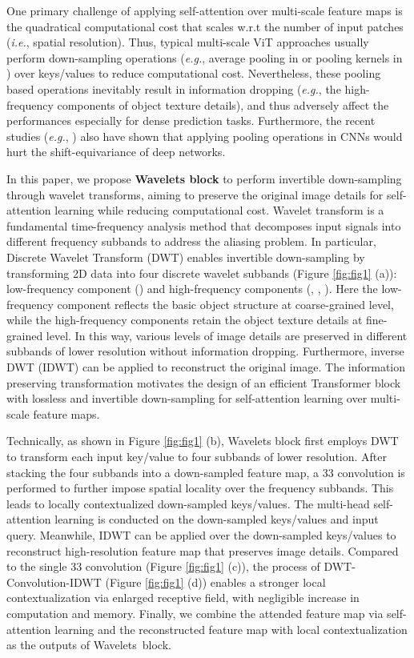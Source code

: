 \documentclass[runningheads]{llncs}
\begin{document}
One primary challenge of applying self-attention over multi-scale feature maps is the quadratical computational cost that scales w.r.t the number of input patches (\emph{i.e.}, spatial resolution). Thus, typical multi-scale ViT approaches usually perform down-sampling operations (\emph{e.g.}, average pooling in \cite{wang2021pvtv2} or pooling kernels in \cite{fan2021multiscale}) over keys/values to reduce computational cost. Nevertheless, these pooling based operations inevitably result in information dropping (\emph{e.g.}, the high-frequency components of object texture details), and thus adversely affect the performances especially for dense prediction tasks. Furthermore, the recent studies (\emph{e.g.}, \cite{zhang2019making}) also have shown that applying pooling operations in CNNs would hurt the shift-equivariance of deep networks.

In this paper, we propose \textbf{Wavelets block} to perform invertible down-sampling through wavelet transforms, aiming to preserve the original image details for self-attention learning while reducing computational cost. Wavelet transform is a fundamental time-frequency analysis method that decomposes input signals into different frequency subbands to address the aliasing problem. In particular, Discrete Wavelet Transform (DWT) \cite{mallat1989theory} enables invertible down-sampling by transforming 2D data into four discrete wavelet subbands (Figure \ref{fig:fig1} (a)): low-frequency component () and high-frequency components (, , ). Here the low-frequency component reflects the basic object structure at coarse-grained level, while the high-frequency components retain the object texture details at fine-grained level. In this way, various levels of image details are preserved in different subbands of lower resolution without information dropping. Furthermore, inverse DWT (IDWT) can be applied to reconstruct the original image. The information preserving transformation motivates the design of an efficient Transformer block with lossless and invertible down-sampling for self-attention learning over multi-scale feature maps.


Technically, as shown in Figure \ref{fig:fig1} (b), Wavelets block first employs DWT to transform each input key/value to four subbands of lower resolution. After stacking the four subbands into a down-sampled feature map, a 33 convolution is performed to further impose spatial locality over the frequency subbands. This leads to locally contextualized down-sampled keys/values. The multi-head self-attention learning is conducted on the down-sampled keys/values and input query. Meanwhile, IDWT can be applied over the down-sampled keys/values to reconstruct high-resolution feature map that preserves image details. Compared to the single 33 convolution (Figure \ref{fig:fig1} (c)), the process of DWT-Convolution-IDWT (Figure \ref{fig:fig1} (d)) enables a stronger local contextualization via enlarged receptive field, with negligible increase in computation and memory. Finally, we combine the attended feature map via self-attention learning and the reconstructed feature map with local contextualization as the outputs of Wavelets~block.
\end{document}
